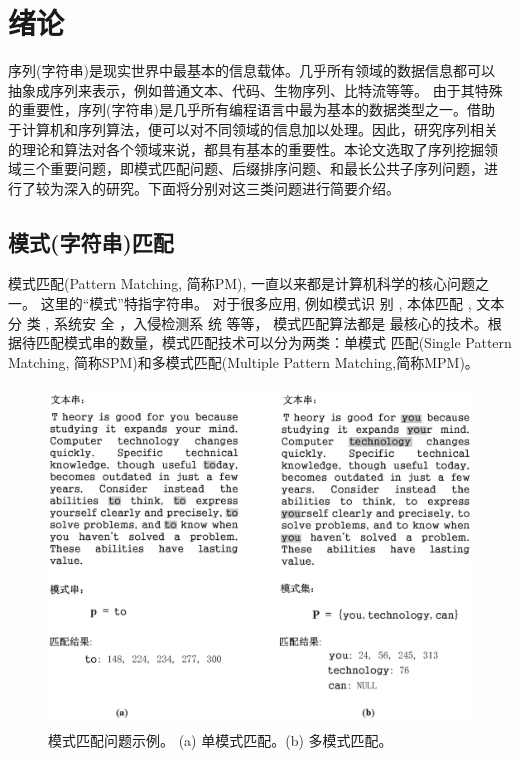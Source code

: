 \chapter{绪论}

序列(字符串)是现实世界中最基本的信息载体。几乎所有领域的数据信息都可以
抽象成序列来表示，例如普通文本、代码、生物序列、比特流等等。 由于其特殊
的重要性，序列(字符串)是几乎所有编程语言中最为基本的数据类型之一。借助
于计算机和序列算法，便可以对不同领域的信息加以处理。因此，研究序列相关
的理论和算法对各个领域来说，都具有基本的重要性。本论文选取了序列挖掘领
域三个重要问题，即模式匹配问题、后缀排序问题、和最长公共子序列问题，进
行了较为深入的研究。下面将分别对这三类问题进行简要介绍。

\section{模式(字符串)匹配}

模式匹配(Pattern Matching, 简称PM), 一直以来都是计算机科学的核心问题之
一。 这里的“模式”特指字符串。 对于很多应用, 例如模式识
别 \cite{Yan2016,Xiao2016}, 本体匹配 \cite{Xue2015,Xue2016}, 文本分
类 \cite{Tang2015,Zhang2016}, 系统安
全 \cite{Dien2014,Malhotra2016,Fan2016}，入侵检测系
统 \cite{Kim2015,Arney2016,Sadotra2016,Lee2017} 等等， 模式匹配算法都是
最核心的技术。根据待匹配模式串的数量，模式匹配技术可以分为两类：单模式
匹配(Single Pattern Matching, 简称SPM)和多模式匹配(Multiple Pattern
Matching,简称MPM)。

\begin{figure}[H]
  \centering
  \includegraphics[height=9cm ,width=14cm]{figures/1_Introduction/SPM_MPM.eps}
  \caption{模式匹配问题示例。 (a) 单模式匹配。(b) 多模式匹配。}
  \label{fig:SPM_MPM}
\end{figure}



